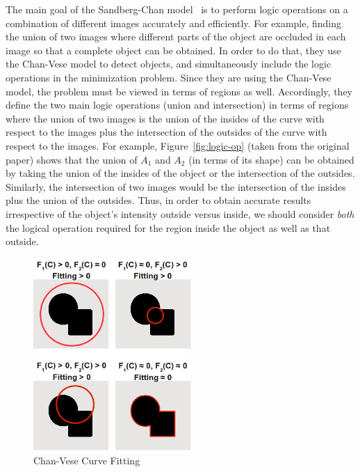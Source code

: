 \documentclass[10pt,twocolumn,letterpaper]{article}
\begin{document}
The main goal of the Sandberg-Chan model~\cite{sandberg2005logic} is to perform logic operations on a combination of different images accurately and
efficiently. For example, finding the union of two images where different parts of the object are occluded in each image so that a complete object can be
obtained. In order to do that, they use the Chan-Vese model to detect objects, and simultaneously include the logic operations in the minimization problem.
Since they are using the Chan-Vese model, the problem must be viewed in terms of regions as well. Accordingly, they define the two main logic operations
(union and intersection) in terms of regions where the union of two images is the union of the insides of the curve with respect to the images plus the
intersection of the outsides of the curve with respect to the images. For example, Figure~\ref{fig:logic-op} (taken from the original paper) shows that the
union of $A_{1}$ and $A_{2}$ (in terms of its shape) can be obtained by taking the union of the insides of the object or the intersection of the outsides.
Similarly, the intersection of two images would be the intersection of the insides plus the union of the outsides. Thus, in order to obtain accurate results
irrespective of the object's intensity outside versus inside, we should consider \textit{both} the logical operation required for the region inside the object
as well as that outside.

\begin{figure}[t!]
\centering
\includegraphics[width=6cm]{fitting.png}
\caption{Chan-Vese Curve Fitting}
\label{fig:fitting}
\end{figure}
\end{document}
